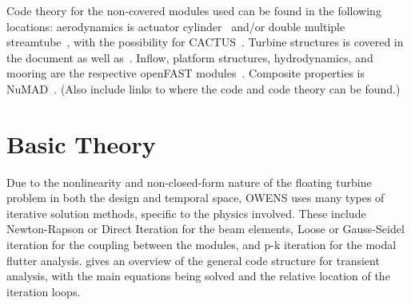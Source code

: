 \documentclass[11pt]{article}
\begin{document}
Code theory for the non-covered modules used can be found in the following locations: aerodynamics is actuator cylinder~\cite{ac} and/or double multiple streamtube~\cite{DMS}, with the possibility for CACTUS~\cite{cactus}.  Turbine structures is covered in the document as well as~\cite{owens2013theoretical}. Inflow, platform structures, hydrodynamics, and mooring are the respective openFAST modules~\cite{openFAST}.  Composite properties is NuMAD~\cite{numad}.  (Also include links to where the code and code theory can be found.)

%

\vspace{12pt}



\section{Basic Theory}

Due to the nonlinearity and non-closed-form nature of the floating turbine problem in both the design and temporal space, OWENS uses many types of iterative solution methods, specific to the physics involved.  These include Newton-Rapson or Direct Iteration for the beam elements, Loose or Gauss-Seidel iteration for the coupling between the modules, and p-k iteration for the modal flutter analysis.   gives an overview of the general code structure for transient analysis, with the main equations being solved and the relative location of the iteration loops.
\end{document}
